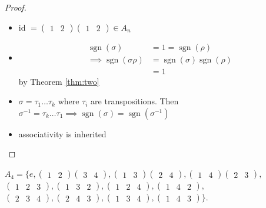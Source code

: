 \begin{proof} \mbox{}

\begin{itemize}
  \item id \(= \begin{pmatrix}1 & 2\end{pmatrix} \begin{pmatrix}1 & 2\end{pmatrix} \in A_n\)

  \item
    \begin{align*}
      \operatorname{sgn}(\sigma) &= 1 = \operatorname{sgn}(\rho) \\ 
      \implies \operatorname{sgn}(\sigma \rho) &= \operatorname{sgn}(\sigma) \operatorname{sgn}(\rho) \\
      &= 1
    \end{align*} by Theorem \ref{thm:two}
  \item
    \(\sigma = \tau_1 \ldots \tau_k\) where \(\tau_i\) are transpositions.
    Then \(\sigma^{-1} = \tau_k \ldots \tau_1 \implies \operatorname{sgn}(\sigma) = \operatorname{sgn}(\sigma^{-1})\)
  \item
    associativity is inherited
\end{itemize}

\end{proof}

\begin{example}
\(A_4 = \{ e, \begin{pmatrix}1 & 2\end{pmatrix} \begin{pmatrix}3 & 4\end{pmatrix}, \begin{pmatrix}1 & 3\end{pmatrix} \begin{pmatrix}2 & 4\end{pmatrix}, \begin{pmatrix}1 & 4\end{pmatrix} \begin{pmatrix}2 & 3\end{pmatrix},\) \(\begin{pmatrix}1 & 2 & 3\end{pmatrix}, \begin{pmatrix}1 & 3 & 2\end{pmatrix}, \begin{pmatrix}1 & 2 & 4\end{pmatrix}, \begin{pmatrix}1 & 4 & 2\end{pmatrix},\) \(\begin{pmatrix}2 & 3 & 4\end{pmatrix}, \begin{pmatrix}2 & 4 & 3\end{pmatrix}, \begin{pmatrix}1 & 3 & 4\end{pmatrix}, \begin{pmatrix}1 & 4 & 3\end{pmatrix} \}\).
\end{example}

